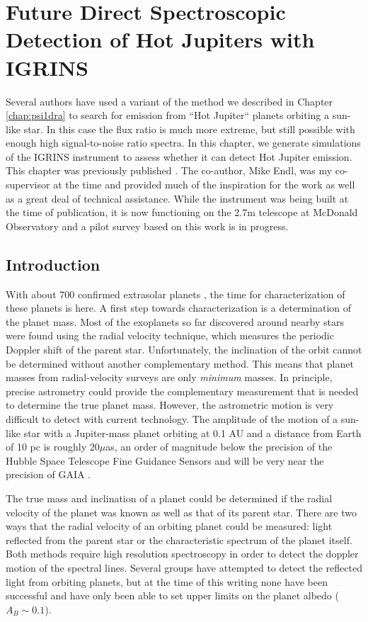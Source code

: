 

\chapter{Future Direct Spectroscopic Detection of Hot Jupiters with IGRINS}
\label{chap:hotjup}
Several authors have used a variant of the method we described in  Chapter \ref{chap:psi1dra} to search for emission from ``Hot Jupiter`` planets orbiting a sun-like star. In this case the flux ratio is much more extreme, but still possible with enough high signal-to-noise ratio spectra. In this chapter, we generate simulations of the IGRINS instrument to assess whether it can detect Hot Jupiter emission. This chapter was previously published \citep{Gullikson2013}. The co-author, Mike Endl, was my co-supervisor at the time and provided much of the inspiration for the work as well as a great deal of technical assistance. While the instrument was being built at the time of publication, it is now functioning on the 2.7m telescope at McDonald Observatory and a pilot survey based on this work is in progress.


\section{Introduction}
With about 700 confirmed extrasolar planets \citep[from
exoplanets.org:][]{exoplanet}, the time for characterization of these
planets is here. A first step towards characterization is a determination of
the planet mass. Most of the exoplanets so far discovered around nearby stars were
found using the radial velocity technique, which measures the periodic
Doppler shift of the parent star. Unfortunately, the inclination of the orbit cannot be determined
without another complementary method. This means that planet masses from
radial-velocity surveys are only \emph{minimum} masses. In principle, precise astrometry could provide the complementary measurement that is needed to determine the true planet mass. However, the astrometric motion is very difficult to detect with current technology. The amplitude of the motion of a sun-like star with a Jupiter-mass planet orbiting at 0.1 AU and a distance from Earth of 10 pc is roughly $20 \mu$as, an order of magnitude below the precision of the Hubble Space Telescope Fine Guidance Sensors \citep{Benedict2006} and will be very near the precision of GAIA \citep{Sozzetti2001}.

The true mass and inclination of a planet could be determined if the
radial velocity of the planet was known as well as that of its parent
star. There are two ways that the
radial velocity of an orbiting planet could be measured: light
reflected from the parent star or the characteristic spectrum of the planet itself. Both methods require high resolution spectroscopy in order to detect the doppler motion of the spectral lines. Several groups have
attempted to detect the reflected light from orbiting planets, but at
the time of this writing none have been successful \citep{Collier2002,
  Rodler2008, Rodler2010, Langford2011} and have only been able to set upper limits on the planet albedo ($A_B \sim 0.1
$).

